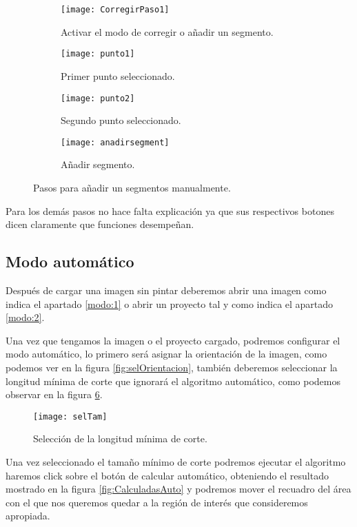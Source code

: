 \begin{figure}
	\begin{subfigure}[c]{.5\linewidth}
	\centering\large \texttt{[image: CorregirPaso1]}
	\caption{Activar el modo de corregir o añadir un segmento.}\label{fig:CorregirPaso1}
	\end{subfigure}%
	\begin{subfigure}[c]{.5\linewidth}
	\centering\large \texttt{[image: punto1]}
	\caption{Primer punto seleccionado.}\label{fig:punto1}
	\end{subfigure}%
	
	\begin{subfigure}[c]{.5\linewidth}
	\centering\large \texttt{[image: punto2]}
	\caption{Segundo punto seleccionado.}\label{fig:punto2}
	\end{subfigure}%
	\begin{subfigure}[c]{.5\linewidth}
	\centering\large \texttt{[image: anadirsegment]}
	\caption{Añadir segmento.}\label{fig:anadirsegment}
	\end{subfigure}%
	\caption{Pasos para añadir un segmentos manualmente.}
\end{figure}

	
Para los demás pasos no hace falta explicación ya que sus respectivos botones dicen claramente que funciones desempeñan.	
	
\subsection{Modo automático}
Después de cargar una imagen sin pintar deberemos abrir una imagen como indica el apartado \ref{modo:1} o abrir un proyecto tal y como indica el apartado \ref{modo:2}.

Una vez que tengamos la imagen o el proyecto cargado, podremos configurar el modo automático, lo primero será asignar la orientación de la imagen, como podemos ver en la figura \ref{fig:selOrientacion}, también deberemos seleccionar la longitud mínima de corte que ignorará el algoritmo automático, como podemos observar en la figura \ref{fig:selTam}.

\begin{figure}[h]
\centering
\texttt{[image: selTam]}
\caption{Selección de la longitud mínima de corte.}
\label{fig:selTam}
\end{figure}

Una vez seleccionado el tamaño mínimo de corte podremos ejecutar el algoritmo haremos click sobre el botón de calcular automático, obteniendo el resultado mostrado en la figura \ref{fig:CalculadasAuto} y podremos mover el recuadro del área con el que nos queremos quedar a la región de interés que consideremos apropiada.

